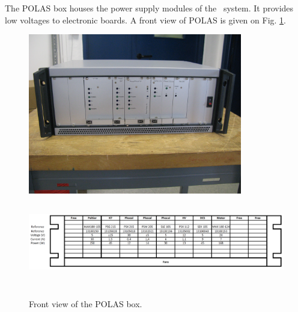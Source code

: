 The POLAS box houses the power supply modules of the \las~system. It provides low voltages to electronic boards. A front view of POLAS is given on Fig. \ref{fig:laspolas}.

\begin{figure}[htbp]
\centering
\includegraphics[height=7cm]{figures/polas_photo.jpg}
\hspace*{-1.5cm}
\includegraphics[height=4cm,width=18cm]{figures/polas_faceavant.pdf}
\caption{Front view of the POLAS box.}\label{fig:laspolas}
\end{figure}